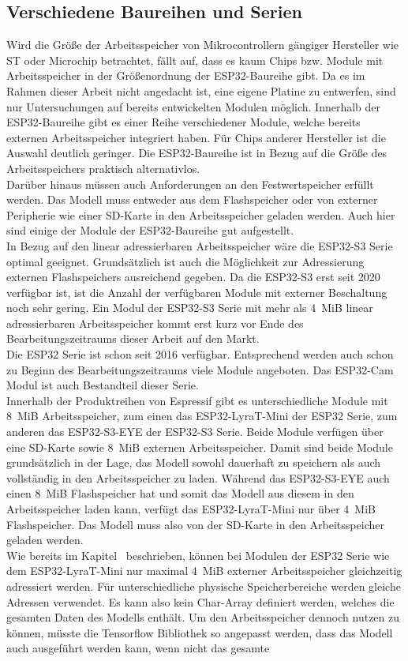 \subsection{Verschiedene Baureihen und Serien}
    Wird die Größe der Arbeitsspeicher von Mikrocontrollern gängiger Hersteller wie ST oder Microchip betrachtet, fällt auf, dass es kaum Chips bzw. Module mit Arbeitsspeicher in der Größenordnung der ESP32-Baureihe gibt. Da es im Rahmen dieser Arbeit nicht angedacht ist, eine eigene Platine zu entwerfen, sind nur Untersuchungen auf bereits entwickelten Modulen möglich. Innerhalb der ESP32-Baureihe gibt es einer Reihe verschiedener Module, welche bereits externen Arbeitsspeicher integriert haben. Für Chips anderer Hersteller ist die Auswahl deutlich geringer. Die ESP32-Baureihe ist in Bezug auf die Größe des Arbeitsspeichers praktisch alternativlos.\\ Darüber hinaus müssen auch Anforderungen an den Festwertspeicher erfüllt werden. Das Modell muss entweder aus dem Flashspeicher oder von externer Peripherie wie einer SD-Karte in den Arbeitsspeicher geladen werden. Auch hier sind einige der Module der ESP32-Baureihe gut aufgestellt.\\ In Bezug auf den linear adressierbaren Arbeitsspeicher wäre die ESP32-S3 Serie optimal geeignet. Grundsätzlich ist auch die Möglichkeit zur Adressierung externen Flashspeichers ausreichend gegeben. Da die ESP32-S3 erst seit 2020 verfügbar ist, ist die Anzahl der verfügbaren Module mit externer Beschaltung noch sehr gering. Ein Modul der ESP32-S3 Serie mit mehr als \SI{4}{MiB} linear adressierbaren Arbeitsspeicher kommt erst kurz vor Ende des Bearbeitungszeitraums dieser Arbeit auf den Markt.\\ Die ESP32 Serie ist schon seit 2016 verfügbar. Entsprechend werden auch schon zu Beginn des Bearbeitungszeitraums viele Module angeboten. Das ESP32-Cam Modul ist auch Bestandteil dieser Serie.\\ Innerhalb der Produktreihen von Espressif gibt es unterschiedliche Module mit \SI{8}{MiB} Arbeitsspeicher, zum einen das ESP32-LyraT-Mini der ESP32 Serie, zum anderen das ESP32-S3-EYE der ESP32-S3 Serie. Beide Module verfügen über eine SD-Karte sowie \SI{8}{MiB} externen Arbeitsspeicher. Damit sind beide Module grundsätzlich in der Lage, das Modell sowohl dauerhaft zu speichern als auch vollständig in den Arbeitsspeicher zu laden. Während das ESP32-S3-EYE auch einen \SI{8}{MiB} Flashspeicher hat und somit das Modell aus diesem in den Arbeitsspeicher laden kann, verfügt das ESP32-LyraT-Mini nur über \SI{4}{MiB} Flashspeicher. Das Modell muss also von der SD-Karte in den Arbeitsspeicher geladen werden.\\ Wie bereits im Kapitel~ beschrieben, können bei Modulen der ESP32 Serie wie dem ESP32-LyraT-Mini nur maximal \SI{4}{MiB} externer Arbeitsspeicher gleichzeitig adressiert werden. Für unterschiedliche physische Speicherbereiche werden gleiche Adressen verwendet. Es kann also kein Char-Array definiert werden, welches die gesamten Daten des Modells enthält. Um den Arbeitsspeicher dennoch nutzen zu können, müsste die Tensorflow Bibliothek so angepasst werden, dass das Modell auch ausgeführt werden kann, wenn nicht das gesamte 
